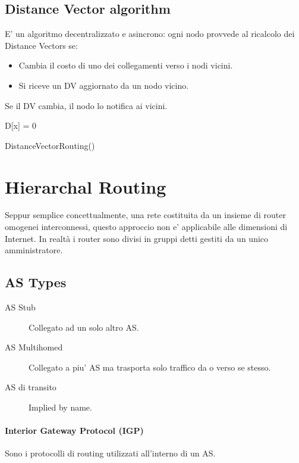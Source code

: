 \subsection{Distance Vector algorithm}
E' un algoritmo decentralizzato e asincrono: ogni nodo provvede al ricalcolo dei Distance Vectors se:
\begin{itemize}
    \item Cambia il costo di uno dei collegamenti verso i nodi vicini.
    \item Si riceve un DV aggiornato da un nodo vicino.
\end{itemize}
Se il DV cambia, il nodo lo notifica ai vicini.
\begin{algorithm*}
     {
    }
    D[x] = 0\\
    \caption{DistanceVectorRouting()}
\end{algorithm*}
\section{Hierarchal Routing}
Seppur semplice concettualmente, una rete costituita da un insieme di router omogenei interconnessi, questo approccio non e' applicabile alle dimensioni di Internet.
In realtà i router sono divisi in gruppi detti  gestiti da un unico amministratore.
\subsection{AS Types}
\begin{description}
    \item[AS Stub] Collegato ad un solo altro AS.
    \item[AS Multihomed] Collegato a piu' AS ma trasporta solo traffico da o verso se stesso.
    \item[AS di transito] Implied by name.   
\end{description}
\paragraph{Interior Gateway Protocol (IGP)} Sono i protocolli di routing utilizzati all'interno di un AS.
